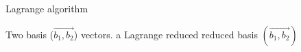 \begin{algorithm}[H]
\caption{Lagrange algorithm}
\label{lagrangeAlgorithm}
\begin{algorithmic}[1]
\REQUIRE Two basis ($\vec{b_1, b_2}$) vectors.
\ENSURE a Lagrange reduced reduced basis $(\vec{b_1, b_2})$

  \ENDIF
\REPEAT {} 

\end{algorithmic}
\end{algorithm}